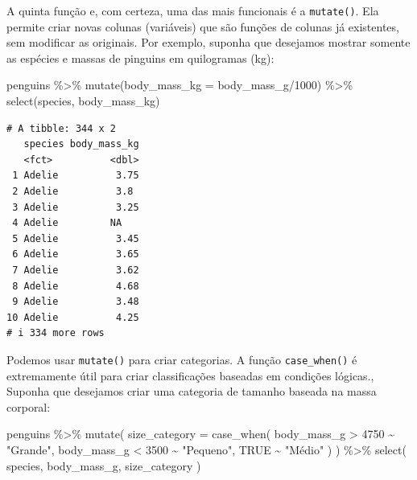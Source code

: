 \documentclass[
  12pt,
  letterpaper,
  DIV=11,
  numbers=noendperiod]{scrreprt}
\newenvironment{Shaded}{\begin{snugshade}}{\end{snugshade}}
\newcommand{\AttributeTok}[1]{\textcolor[rgb]{0.40,0.45,0.13}{#1}}
\newcommand{\ConstantTok}[1]{\textcolor[rgb]{0.56,0.35,0.01}{#1}}
\newcommand{\DecValTok}[1]{\textcolor[rgb]{0.68,0.00,0.00}{#1}}
\newcommand{\FunctionTok}[1]{\textcolor[rgb]{0.28,0.35,0.67}{#1}}
\newcommand{\NormalTok}[1]{\textcolor[rgb]{0.00,0.23,0.31}{#1}}
\newcommand{\SpecialCharTok}[1]{\textcolor[rgb]{0.37,0.37,0.37}{#1}}
\newcommand{\StringTok}[1]{\textcolor[rgb]{0.13,0.47,0.30}{#1}}
\theoremstyle{definition}
\theoremstyle{exemplo}
\begin{document}
A quinta função e, com certeza, uma das mais funcionais é a
\texttt{mutate()}. Ela permite criar novas colunas (variáveis) que são
funções de colunas já existentes, sem modificar as originais. Por
exemplo, suponha que desejamos mostrar somente as espécies e massas de
pinguins em quilogramas (kg):

\begin{Shaded}
\begin{Highlighting}[]
\NormalTok{penguins }\SpecialCharTok{\%\textgreater{}\%} 
  \FunctionTok{mutate}\NormalTok{(}\AttributeTok{body\_mass\_kg =}\NormalTok{ body\_mass\_g}\SpecialCharTok{/}\DecValTok{1000}\NormalTok{) }\SpecialCharTok{\%\textgreater{}\%} 
  \FunctionTok{select}\NormalTok{(species, body\_mass\_kg)}
\end{Highlighting}
\end{Shaded}

\begin{verbatim}
# A tibble: 344 x 2
   species body_mass_kg
   <fct>          <dbl>
 1 Adelie          3.75
 2 Adelie          3.8 
 3 Adelie          3.25
 4 Adelie         NA   
 5 Adelie          3.45
 6 Adelie          3.65
 7 Adelie          3.62
 8 Adelie          4.68
 9 Adelie          3.48
10 Adelie          4.25
# i 334 more rows
\end{verbatim}

\noindent Podemos usar \texttt{mutate()} para criar categorias. A função
\texttt{case\_when()} é extremamente útil para criar classificações
baseadas em condições lógicas., Suponha que desejamos criar uma
categoria de tamanho baseada na massa corporal:

\begin{Shaded}
\begin{Highlighting}[]
\NormalTok{penguins }\SpecialCharTok{\%\textgreater{}\%} 
  \FunctionTok{mutate}\NormalTok{(}
    \AttributeTok{size\_category =} \FunctionTok{case\_when}\NormalTok{(}
\NormalTok{      body\_mass\_g }\SpecialCharTok{\textgreater{}} \DecValTok{4750} \SpecialCharTok{\textasciitilde{}} \StringTok{"Grande"}\NormalTok{,}
\NormalTok{      body\_mass\_g }\SpecialCharTok{\textless{}} \DecValTok{3500} \SpecialCharTok{\textasciitilde{}} \StringTok{"Pequeno"}\NormalTok{,}
      \ConstantTok{TRUE} \SpecialCharTok{\textasciitilde{}} \StringTok{"Médio"}
\NormalTok{    )}
\NormalTok{  ) }\SpecialCharTok{\%\textgreater{}\%} 
  \FunctionTok{select}\NormalTok{(}
\NormalTok{    species, body\_mass\_g, size\_category}
\NormalTok{  )}
\end{Highlighting}
\end{Shaded}
\end{document}
